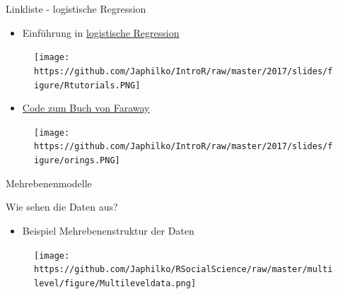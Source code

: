 \documentclass[ignorenonframetext,]{beamer}
\providecommand{\tightlist}{%
\setlength{\itemsep}{0pt}\setlength{\parskip}{0pt}}
\begin{document}
\begin{frame}{Linkliste - logistische Regression}

\begin{itemize}
\tightlist
\item
  Einführung in
  \href{http://ww2.coastal.edu/kingw/statistics/R-tutorials/logistic.html}{logistische
  Regression}
\end{itemize}

\begin{figure}[htbp]
\centering
\texttt{[image: https://github.com/Japhilko/IntroR/raw/master/2017/slides/figure/Rtutorials.PNG]}
\caption{}
\end{figure}

\begin{itemize}
\tightlist
\item
  \href{http://www.maths.bath.ac.uk/~jjf23/ELM/scripts/binary.R}{Code
  zum Buch von Faraway}
\end{itemize}

\begin{figure}[htbp]
\centering
\texttt{[image: https://github.com/Japhilko/IntroR/raw/master/2017/slides/figure/orings.PNG]}
\caption{}
\end{figure}

\end{frame}

\begin{frame}{Mehrebenenmodelle}

\end{frame}

\begin{frame}{Wie sehen die Daten aus?}

\begin{itemize}
\tightlist
\item
  Beispiel Mehrebenenstruktur der Daten
\end{itemize}

\begin{figure}[htbp]
\centering
\texttt{[image: https://github.com/Japhilko/RSocialScience/raw/master/multilevel/figure/Multileveldata.png]}
\caption{}
\end{figure}

\end{frame}
\end{document}
